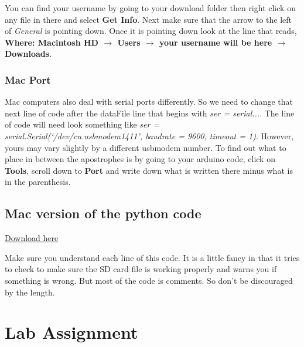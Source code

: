 You can find your username by going to your download folder then right click
on any file in there and select \textbf{Get Info}. Next make sure that the
arrow to the left of \textit{General} is pointing down. Once it is pointing
down look at the line that reads, \textbf{Where: Macintosh HD $\rightarrow $
Users $\rightarrow $ your username will be here $\rightarrow $ Downloads}.

\subsubsection{Mac Port}

Mac computers also deal with serial ports differently. So we need to change
that next line of code after the dataFile line that begins with \textit{ser
= serial...}. The line of code will need look something like \textit{ser =
serial.Serial(`/dev/cu.usbmodem1411', baudrate = 9600, timeout = 1)}.
However, yours may vary slightly by a different usbmodem number. To find out
what to place in between the apostrophes is by going to your arduino code,
click on \textbf{Tools}, scroll down to \textbf{Port} and write down what is
written there minus what is in the parenthesis.

\subsection{Mac version of the python code}
\href{https://dtoliphant.github.io/PH250Manual/Code/Data2Computer_PythonSide_Mac.py}{Download here}


Make sure you understand each line of this code. It is a little fancy in
that it tries to check to make sure the SD card file is working properly and
warns you if something is wrong. But most of the code is comments. So don't
be discouraged by the length.

\section{Lab Assignment}

